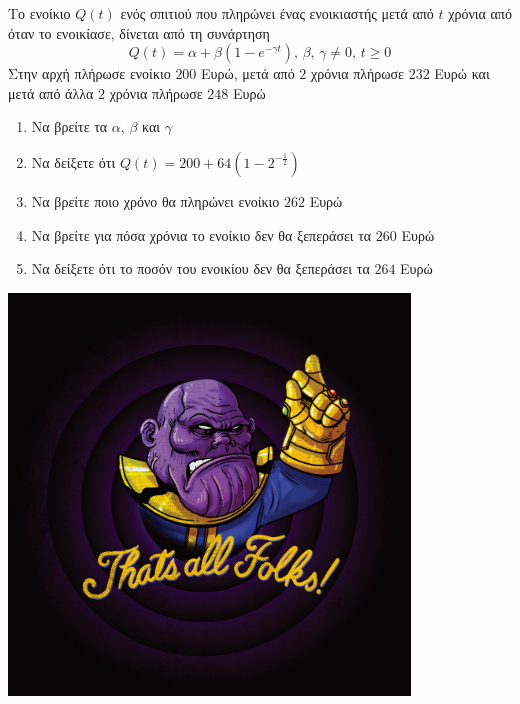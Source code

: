\documentclass[greek]{beamer}
\begin{document}
\begin{askisi}
  Το ενοίκιο $Q(t)$ ενός σπιτιού που πληρώνει ένας ενοικιαστής μετά από $t$ χρόνια από όταν το ενοικίασε, δίνεται από τη συνάρτηση
  $$Q(t)=α+β(1-e^{-γt}) \text{, } β \text{, } γ\ne 0\text{, } t\ge 0$$
  Στην αρχή πλήρωσε ενοίκιο $200$ Ευρώ, μετά από $2$ χρόνια πλήρωσε $232$ Ευρώ και μετά από άλλα $2$ χρόνια πλήρωσε $248$ Ευρώ
  \begin{enumerate}
    \item<1-> Να βρείτε τα $α$, $β$ και $γ$
    \item<2-> Να δείξετε ότι $Q(t)=200+64\left( 1-2^{-\frac{1}{2}} \right) $
    \item<3-> Να βρείτε ποιο χρόνο θα πληρώνει ενοίκιο $262$ Ευρώ
    \item<4-> Να βρείτε για πόσα χρόνια το ενοίκιο δεν θα ξεπεράσει τα $260$ Ευρώ
    \item<5-> Να δείξετε ότι το ποσόν του ενοικίου δεν θα ξεπεράσει τα $264$ Ευρώ
  \end{enumerate}


\end{askisi}

\begin{frame}
  \centering
  \includegraphics[width=0.8\textwidth]{"./images/thatsall.png"}

\end{frame}

\appendix

\section{}
\end{document}
